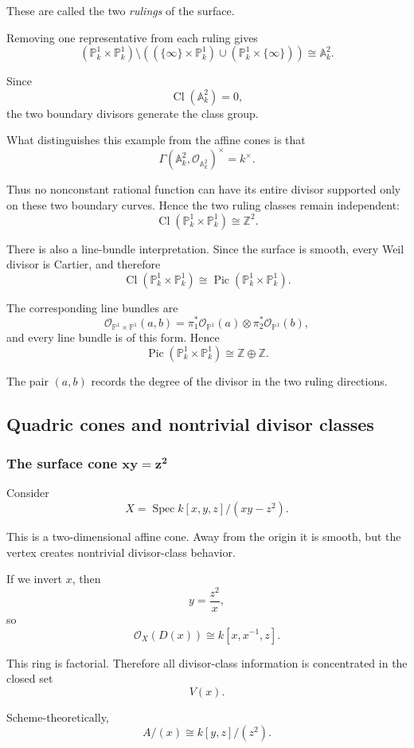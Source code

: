 \documentclass[12pt,a4paper]{article}
\DeclareMathOperator{\Spec}{Spec}
\newcommand{\OO}{\mathcal{O}}
\newcommand{\Pic}{\operatorname{Pic}}
\newcommand{\Z}{\mathbb{Z}}
\newcommand{\Cl}{\operatorname{Cl}}
\providecommand{\Spec}{\operatorname{Spec}}
\providecommand{\A}{\mathbb A}
\providecommand{\Pj}{\mathbb P}
\theoremstyle{notespace}
\begin{document}
These are called the two \emph{rulings} of the surface.

Removing one representative from each ruling gives
\[
(\Pj^1_k\times\Pj^1_k)
\setminus
\left(
(\{\infty\}\times\Pj^1_k)
\cup
(\Pj^1_k\times\{\infty\})
\right)
\cong
\A^2_k.
\]

Since
\[
\Cl(\A^2_k)=0,
\]
the two boundary divisors generate the class group.

What distinguishes this example from the affine cones is that
\[
\Gamma(\A^2_k,\OO_{\A^2_k})^\times
=
k^\times.
\]

Thus no nonconstant rational function can have its entire divisor supported only on these two boundary curves. Hence the two ruling classes remain independent:
\[
\Cl(\Pj^1_k\times\Pj^1_k)\cong \Z^2.
\]

There is also a line-bundle interpretation. Since the surface is smooth, every Weil divisor is Cartier, and therefore
\[
\Cl(\Pj^1_k\times\Pj^1_k)
\cong
\Pic(\Pj^1_k\times\Pj^1_k).
\]

The corresponding line bundles are
\[
\OO_{\Pj^1\times\Pj^1}(a,b)
=
\pi_1^*\OO_{\Pj^1}(a)\otimes
\pi_2^*\OO_{\Pj^1}(b),
\]
and every line bundle is of this form. Hence
\[
\Pic(\Pj^1_k\times\Pj^1_k)
\cong
\Z\oplus \Z.
\]

The pair \((a,b)\) records the degree of the divisor in the two ruling directions.

\subsection{Quadric cones and nontrivial divisor classes}

\subsubsection{The surface cone \(\boldsymbol{xy=z^2}\)}

Consider
\[
X=\Spec k[x,y,z]/(xy-z^2).
\]

This is a two-dimensional affine cone. Away from the origin it is smooth, but the vertex creates nontrivial divisor-class behavior.

If we invert \(x\), then
\[
y=\frac{z^2}{x},
\]
so
\[
\OO_X(D(x))
\cong
k[x,x^{-1},z].
\]

This ring is factorial. Therefore all divisor-class information is concentrated in the closed set
\[
V(x).
\]

Scheme-theoretically,
\[
A/(x)\cong k[y,z]/(z^2).
\]
\end{document}
